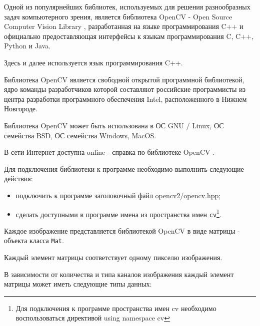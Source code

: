 

Одной из популярнейших библиотек, используемых для решения разнообразных задач компьютерного зрения, является библиотека OpenCV - Open Source Computer Vision Library \cite{opencv}, разработанная на языке программирования C++ и официально предоставляющая интерфейсы к языкам программирования C, C++, Python и Java.

Здесь и далее используется язык программирования C++.

Библиотека OpenCV является свободной открытой программной библиотекой, ядро команды разработчиков которой составляют российские программисты из центра разработки программного обеспечения Intel, расположенного в Нижнем Новгороде.

Библиотека OpenCV может быть использована в ОС GNU / Linux, ОС семейства BSD, ОС семейства Windows, MacOS.

В сети Интернет доступна online - справка по библиотеке OpenCV \cite{opencv-help}.


% 


Для подключения библиотеки к программе необходимо выполнить следующие действия:

\begin{itemize}
		
	\item подключить к программе заголовочный файл opencv2/opencv.hpp;
	\item сделать доступными в программе имена из пространства имен \verb|cv|\footnote{Для подключения к программе пространства имен cv необходимо воспользоваться директивой using namespace cv}.

\end{itemize}


Каждое изображение представляется библиотекой OpenCV в виде матрицы - объекта класса \verb|Mat|.

Каждый элемент матрицы соответствует одному пикселю изображения.

В зависимости от количества и типа каналов изображения каждый элемент матрицы может иметь следующие типы данных:

